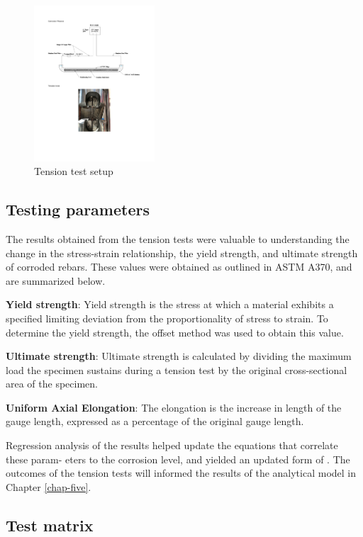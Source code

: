 \begin{figure}[htbp]
	\centering
	\includegraphics[width=0.4\textwidth]{VAC Thesis 2.0/Chapter-3/figs/tension_test_utm.pdf}
	\caption{Tension test setup}
	\label{fig:TensionTest}
\end{figure}

\subsection{Testing parameters}
The results obtained from the tension tests were valuable to understanding the change in the stress-strain relationship, the yield strength, and ultimate strength of corroded rebars. These values were obtained as outlined in ASTM A370, and are summarized below.

\textbf{Yield strength}: Yield strength is the stress at which a material exhibits a specified limiting deviation from the proportionality of stress to strain. To determine the yield strength, the offset method was used to obtain this value.

\textbf{Ultimate strength}: Ultimate strength is calculated by dividing the maximum load the specimen sustains during a tension test by the original cross-sectional area of the specimen.

\textbf{Uniform Axial Elongation}: The elongation is the increase in length of the gauge length, expressed as a percentage of the original gauge length.

Regression analysis of the results helped update the equations that correlate these param- eters to the corrosion level, and yielded an updated form of . The outcomes of the tension tests will informed the results of the analytical model in Chapter \ref{chap-five}.

\subsection{Test matrix}

